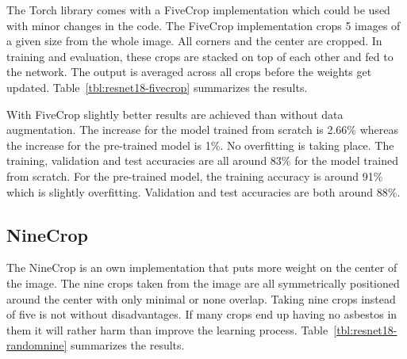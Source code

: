 The Torch library comes with a FiveCrop implementation which could be used with minor changes in the code. The FiveCrop implementation crops 5 images of a given size from the whole image. All corners and the center are cropped. In training and evaluation, these crops are stacked on top of each other and fed to the network. The output is averaged across all crops before the weights get updated. Table~\ref{tbl:resnet18-fivecrop} summarizes the results.\\


\begin{table}[!h] \centering
{}
\caption{Resnet18 FiveCrop implementation with and without pre-training. FINAL (regular) means ResNet18 with the resizing of the image instead of cropping and averaging.}
\label{tbl:resnet18-fivecrop}
\end{table}

With FiveCrop slightly better results are achieved than without data augmentation. The increase for the model trained from scratch is 2.66\% whereas the increase for the pre-trained model is 1\%. No overfitting is taking place. The training, validation and test accuracies are all around 83\% for the model trained from scratch. For the pre-trained model, the training accuracy is around 91\% which is slightly overfitting. Validation and test accuracies are both around 88\%.

\newpage

\subsection{NineCrop}

The NineCrop is an own implementation that puts more weight on the center of the image. The nine crops taken from the image are all symmetrically positioned around the center with only minimal or none overlap. Taking nine crops instead of five is not without disadvantages. If many crops end up having no asbestos in them it will rather harm than improve the learning process. Table~\ref{tbl:resnet18-randomnine} summarizes the results.\\

